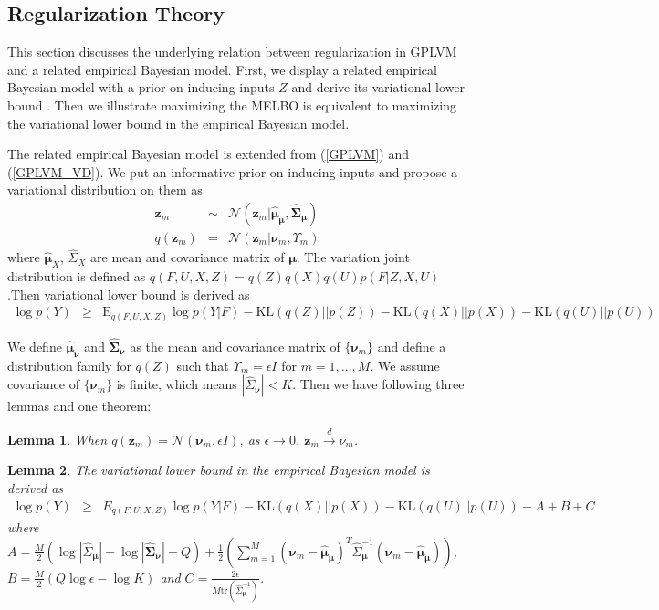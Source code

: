 \documentclass{article}
\newtheorem{lemma}{Lemma}
\begin{document}
\subsection{Regularization Theory} \label{sec:rt}
This section discusses the underlying relation between regularization in GPLVM and a related empirical Bayesian model. First, we display a related empirical Bayesian model with a prior on inducing inputs $Z$ and derive its variational lower bound . Then we illustrate maximizing the MELBO is equivalent to maximizing the variational lower bound in the empirical Bayesian model.

The related empirical Bayesian model is extended from (\ref{GPLVM}) and (\ref{GPLVM_VD}). We put an informative prior on inducing inputs and propose a variational distribution on them as 
\begin{eqnarray}
\bm z_m & \sim & \mathcal{N}(\bm z_m| \hat{\bm \mu}_{\bm\mu}, \hat{\bm\Sigma}_{\bm\mu}) \nonumber \\
q(\bm z_m) & = & \mathcal{N}(\bm z_m|\bm \nu_m, \Upsilon_m) \nonumber
\end{eqnarray}
where $\hat{\bm \mu}_X$, $\hat{\Sigma}_X$ are mean and covariance matrix of $\bm \mu$. The variation joint distribution is defined as $q(F, U, X, Z) = q(Z)q(X)q(U)p(F|Z, X, U)$.Then variational lower bound is derived as
\begin{eqnarray}
\log p(Y) & \geq & \mathrm{E}_{q(F, U, X, Z)}\log p(Y|F) - \mathrm{KL}(q(Z)||p(Z)) - \mathrm{KL}(q(X)||p(X)) - \mathrm{KL}(q(U)||p(U)) \nonumber
\end{eqnarray}

We define $\hat{\bm \mu}_{\bm\nu}$ and $\hat{\bm\Sigma}_{\bm\nu}$ as the mean and covariance matrix of $\{\bm \nu_m\}$ and define a distribution family for $q(Z)$ such that $\Upsilon_{m} = \epsilon I$ for $m = 1,\ldots, M$. We assume covariance of $\{\bm \nu_m\}$ is finite, which means $|\hat{\Sigma}_{\bm \nu}| < K$. Then we have following three lemmas and one theorem:

\begin{lemma}
	When $q(\bm z_m) = \mathcal{N}(\bm \nu_m, \epsilon I)$, as $\epsilon \rightarrow 0$, $\bm z_m \stackrel{d}{\rightarrow} \nu_m$.
\end{lemma}

\begin{lemma}
	The variational lower bound in the empirical Bayesian model is derived as 
	\begin{eqnarray}
	\log p(Y) & \geq & E_{q(F, U, X, Z)}\log p(Y|F) - \mathrm{KL}(q(X)||p(X)) - \mathrm{KL}(q(U)||p(U)) - A + B + C \nonumber
	\end{eqnarray}
	where $A = \frac{M}{2}(\log |\hat{\Sigma}_{\bm \mu}| + \log|\hat{\bm\Sigma}_{\bm\nu}| + Q) + \frac{1}{2}\left(\sum_{m = 1}^M(\bm\nu_m - \hat{\bm \mu}_{\bm \mu})^T\hat{\Sigma}_{\bm\mu}^{-1}(\bm\nu_m - \hat{\bm \mu}_{\bm \mu})\right)$, $B = \frac{M}{2}(Q\log\epsilon-\log K)$ and $C = \frac{2\epsilon}{M\mathrm{tr}(\hat{\Sigma}_{\bm\mu}^{-1})}$.
\end{lemma}
	
\end{document}
